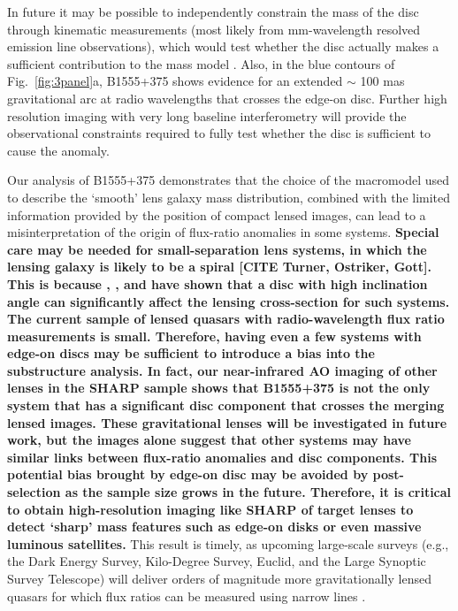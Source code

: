 \documentclass[a4paper,fleqn,usenatbib,useAMS]{mnras}
\begin{document}
In future it may be possible to independently constrain the mass
of the disc through kinematic measurements (most likely from
mm-wavelength resolved emission line observations), which would test
whether the disc actually makes a sufficient contribution to the mass
model \citep[e.g. as in the case of B1933+503;][]{suyu12}. Also, in
the blue contours of Fig.~\ref{fig:3panel}a, B1555+375 shows evidence
for an extended $\sim$ 100 mas gravitational arc at radio wavelengths
that crosses the edge-on disc. Further high resolution imaging with
very long baseline interferometry will provide the observational
constraints required to fully test whether the disc is sufficient to
cause the anomaly.

Our analysis of B1555+375 demonstrates that the choice of the macromodel used to describe the `smooth' lens galaxy mass distribution, combined with the limited information provided by the position of compact lensed images, can lead to a misinterpretation of the origin of flux-ratio anomalies in some systems. \textbf{Special care may be needed for small-separation lens systems, in which the lensing galaxy is likely to be a spiral [CITE Turner, Ostriker, Gott].  This is because \citet{Maller97}, \citet{Kee98}, and \citet{Moller03} have shown that a disc with high inclination angle can significantly affect the lensing cross-section for such systems. The current sample of lensed quasars with radio-wavelength flux ratio measurements is small.  Therefore, having even a few systems with edge-on discs may be sufficient to introduce a bias into the substructure analysis. In fact, our near-infrared AO imaging of
other lenses in the SHARP sample shows that B1555+375 is not the only
system that has a significant disc component that crosses the merging lensed images.  These gravitational lenses will be investigated in future
work, but the images alone suggest that other systems may have similar
links between flux-ratio anomalies and disc components. This potential bias brought by edge-on disc may be avoided by post-selection as the sample size grows in the future. Therefore, it is critical to obtain high-resolution imaging like SHARP of target lenses to detect `sharp' mass features such as edge-on disks or even massive luminous satellites.} 
 This result is timely, as upcoming large-scale surveys (e.g., the Dark Energy Survey, Kilo-Degree Survey, Euclid, and the Large Synoptic Survey Telescope) will deliver orders of magnitude more gravitationally lensed quasars for which flux ratios can
  be measured using narrow lines \citep[e.g.][]{N14}.
\end{document}
